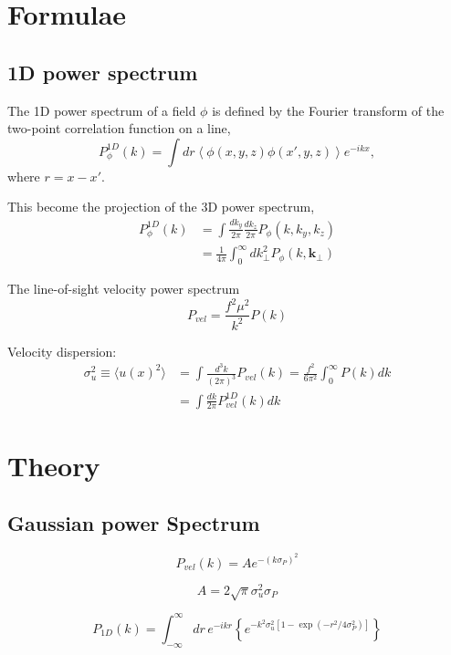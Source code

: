 \documentclass[a4paper,11pt]{article}
\begin{document}
\section{Formulae}
\subsection{1D power spectrum}

The 1D power spectrum of a field $\phi$ is defined by the Fourier transform of the two-point correlation function on a line,
\begin{equation}
  P_\phi^{1D}(k) = \int \! dr
                  \left\langle \phi(x, y, z) \phi(x', y, z) \right\rangle
                  e^{-ikx},
\end{equation}
where $r = x - x'$.

This become the projection of the 3D power spectrum,
\begin{align}
  P_\phi^{1D}(k) &= \int \! \frac{dk_y}{2\pi} \frac{dk_z}{2\pi}
                   P_\phi(k, k_y, k_z)\\
                &= \frac{1}{4\pi} \int_0^\infty d k_\perp^2 P_\phi(k, \bm{k}_\perp) 
\end{align}

The line-of-sight velocity power spectrum
\begin{equation}
  P_{vel} = \frac{f^2 \mu^2}{k^2} P(k)
\end{equation}

Velocity dispersion:
\begin{align}
  \sigma_u^2 \equiv \langle u(x)^2 \rangle
  &= \int \! \frac{d^3 k}{(2\pi)^3} P_{vel}(k)
   = \frac{f^2}{6\pi^2} \int_0^\infty P(k) dk \\
  &= \int \frac{dk}{2\pi} P^{1D}_{vel}(k) dk
\end{align}


%
%
\section{Theory}

\subsection{Gaussian power Spectrum}

\begin{equation}
  P_{vel}(k) = A e^{-(k\sigma_P)^2}
\end{equation}

\begin{equation}
  A = 2\sqrt{\pi} \sigma_u^2 \sigma_P
\end{equation}

\begin{equation}
  P_{1D}(k) = \int_{-\infty}^\infty \! dr \, e^{-ikr} \left\{
  e^{-k^2 \sigma_u^2 \left[ 1 - \exp \left( -r^2/4 \sigma_P^2 \right) \right]}
  \right\}
\end{equation}
    


\label{LastPage}
\end{document}
